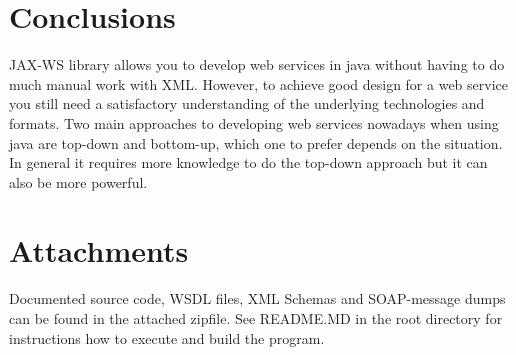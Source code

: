 \documentclass[a4paper, 11pt]{article}
\begin{document}
\section*{Conclusions}
JAX-WS library allows you to develop web services in java without having to do much manual work with XML. However, to achieve good design for a web service you still need a satisfactory understanding of the underlying technologies and formats. Two main approaches to developing web services nowadays when using java are top-down and bottom-up, which one to prefer depends on the situation. In general it requires more knowledge to do the top-down approach but it can also be more powerful.

\section*{Attachments}
Documented source code, WSDL files, XML Schemas and SOAP-message dumps can be found in the attached zipfile. See README.MD in the root directory for instructions how to execute and build the program.

{}

\end{document}
